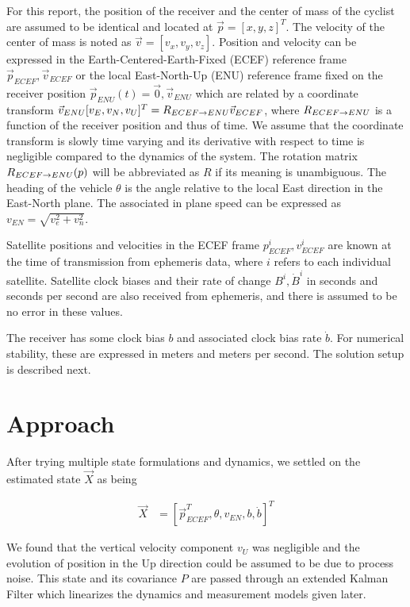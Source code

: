 \documentclass[letterpaper,times]{IONconf}
\begin{document}
For this report, the position of the receiver and the center of mass of the cyclist are assumed to be identical and located at $\vec{p} = [x,y,z]^T$. The velocity of the center of mass is noted as $\vec{v} = [v_x,v_y,v_z]$. Position and velocity can be expressed in the Earth-Centered-Earth-Fixed (ECEF) reference frame $\vec{p}_{ECEF},\vec{v}_{ECEF}$ or the local East-North-Up (ENU) reference frame fixed on the receiver position $\vec{p}_{ENU}(t) = \vec{0},\vec{v}_{ENU}$ which are related by a coordinate transform $\vec{v}_{ENU} [v_E,v_N,v_U]^T = R_{ECEF\to ENU}{} \vec{v}_{ECEF}$, where $R_{ECEF\to ENU}$ is a function of the receiver position and thus of time. We assume that the coordinate transform is slowly time varying and its derivative with respect to time is negligible compared to the dynamics of the system. The rotation matrix $R_{ECEF\to ENU}(p)$ will be abbreviated as $R$ if its meaning is unambiguous. The heading of the vehicle $\theta$ is the angle relative to the local East direction in the East-North plane. The associated in plane speed can be expressed as $v_{EN} = \sqrt{ v_e^2+v_n^2}$. 

Satellite positions and velocities in the ECEF frame $p_{ECEF}^i,v_{ECEF}^i$ are known at the time of transmission from ephemeris data, where $i$ refers to each individual satellite. Satellite clock biases and their rate of change $B^i,\dot{B}^i$ in seconds and seconds per second are also received from ephemeris, and there is assumed to be no error in these values. 

The receiver has some clock bias $b$ and associated clock bias rate $\dot{b}$. For numerical stability, these are expressed in meters and meters per second. The solution setup is described next.

\section{Approach}

\newcommand{\X}{\vec{X}}
\newcommand{\ven}{v_{EN}}


After trying multiple state formulations and dynamics, we settled on the estimated state $\X$ as being 

\begin{align*}
    \X &= [
        \vec{p}_{ECEF}^T , \theta, v_{EN}, b, \dot{b}
    ]^T
\end{align*}

We found that the vertical velocity component $v_U$ was negligible and the evolution of position in the Up direction could be assumed to be due to process noise. This state and its covariance $P$ are passed through an extended Kalman Filter which linearizes the dynamics and measurement models given later. 
\end{document}
